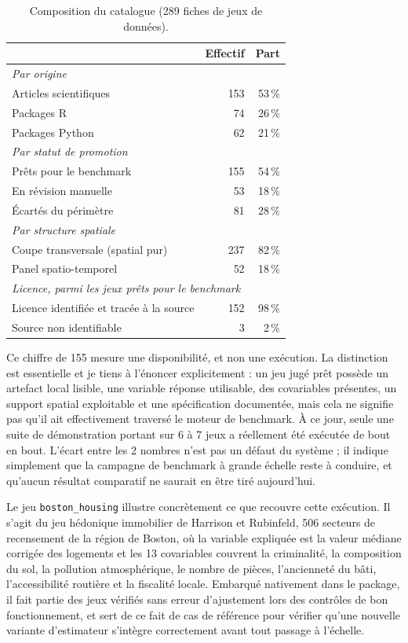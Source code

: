 \documentclass[11pt,a4paper]{article}
\begin{document}
\begin{table}[h]
\centering
\small
\begin{tabular}{lrr}
\toprule
& Effectif & Part \\
\midrule
\multicolumn{3}{l}{\textit{Par origine}} \\
Articles scientifiques & 153 & 53\,\% \\
Packages R & 74 & 26\,\% \\
Packages Python & 62 & 21\,\% \\
\midrule
\multicolumn{3}{l}{\textit{Par statut de promotion}} \\
Prêts pour le benchmark & 155 & 54\,\% \\
En révision manuelle & 53 & 18\,\% \\
Écartés du périmètre & 81 & 28\,\% \\
\midrule
\multicolumn{3}{l}{\textit{Par structure spatiale}} \\
Coupe transversale (spatial pur) & 237 & 82\,\% \\
Panel spatio-temporel & 52 & 18\,\% \\
\midrule
\multicolumn{3}{l}{\textit{Licence, parmi les jeux prêts pour le benchmark}} \\
Licence identifiée et tracée à la source & 152 & 98\,\% \\
Source non identifiable & 3 & 2\,\% \\
\bottomrule
\end{tabular}
\caption{Composition du catalogue (289 fiches de jeux de données).}
\label{tab:composition-catalogue}
\end{table}

Ce chiffre de 155 mesure une disponibilité, et non une exécution. La distinction est essentielle et je tiens à l'énoncer explicitement : un jeu jugé prêt possède un artefact local lisible, une variable réponse utilisable, des covariables présentes, un support spatial exploitable et une spécification documentée, mais cela ne signifie pas qu'il ait effectivement traversé le moteur de benchmark. À ce jour, seule une suite de démonstration portant sur 6 à 7 jeux a réellement été exécutée de bout en bout. L'écart entre les 2 nombres n'est pas un défaut du système ; il indique simplement que la campagne de benchmark à grande échelle reste à conduire, et qu'aucun résultat comparatif ne saurait en être tiré aujourd'hui.

Le jeu \texttt{boston\_housing} illustre concrètement ce que recouvre cette exécution. Il s'agit du jeu hédonique immobilier de Harrison et Rubinfeld, 506 secteurs de recensement de la région de Boston, où la variable expliquée est la valeur médiane corrigée des logements et les 13 covariables couvrent la criminalité, la composition du sol, la pollution atmosphérique, le nombre de pièces, l'ancienneté du bâti, l'accessibilité routière et la fiscalité locale. Embarqué nativement dans le package, il fait partie des jeux vérifiés sans erreur d'ajustement lors des contrôles de bon fonctionnement, et sert de ce fait de cas de référence pour vérifier qu'une nouvelle variante d'estimateur s'intègre correctement avant tout passage à l'échelle.
\end{document}
